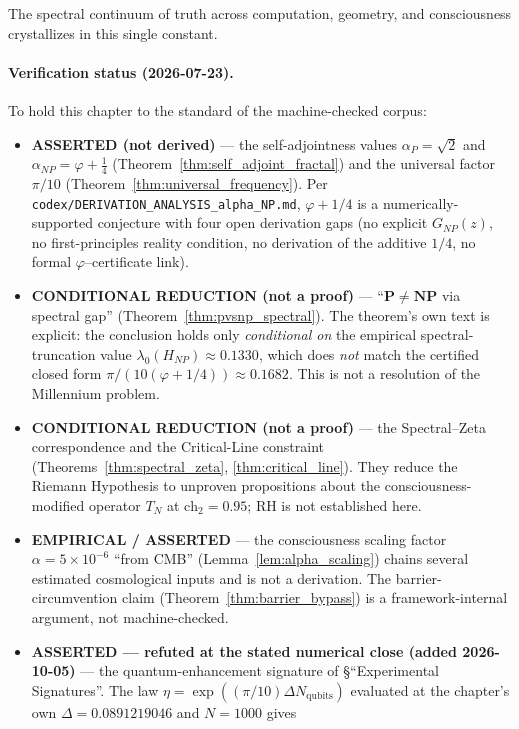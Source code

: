 The spectral continuum of truth across computation, geometry, and consciousness crystallizes in this single constant.

\paragraph{Verification status (2026-07-23).}
To hold this chapter to the standard of the machine-checked corpus:
\begin{itemize}
\item \textbf{ASSERTED (not derived)} --- the self-adjointness values $\alpha_P=\sqrt{2}$ and $\alpha_{NP}=\varphi+\tfrac14$ (Theorem~\ref{thm:self_adjoint_fractal}) and the universal factor $\pi/10$ (Theorem~\ref{thm:universal_frequency}). Per \texttt{codex/DERIVATION\_ANALYSIS\_alpha\_NP.md}, $\varphi+1/4$ is a numerically-supported conjecture with four open derivation gaps (no explicit $G_{NP}(z)$, no first-principles reality condition, no derivation of the additive $1/4$, no formal $\varphi$--certificate link).
\item \textbf{CONDITIONAL REDUCTION (not a proof)} --- ``$\mathbf{P}\neq\mathbf{NP}$ via spectral gap'' (Theorem~\ref{thm:pvsnp_spectral}). The theorem's own text is explicit: the conclusion holds only \emph{conditional on} the empirical spectral-truncation value $\lambda_0(H_{NP})\approx0.1330$, which does \emph{not} match the certified closed form $\pi/(10(\varphi+1/4))\approx0.1682$. This is not a resolution of the Millennium problem.
\item \textbf{CONDITIONAL REDUCTION (not a proof)} --- the Spectral--Zeta correspondence and the Critical-Line constraint (Theorems~\ref{thm:spectral_zeta}, \ref{thm:critical_line}). They reduce the Riemann Hypothesis to unproven propositions about the consciousness-modified operator $T_N$ at $\text{ch}_2=0.95$; RH is not established here.
\item \textbf{EMPIRICAL / ASSERTED} --- the consciousness scaling factor $\alpha=5\times10^{-6}$ ``from CMB'' (Lemma~\ref{lem:alpha_scaling}) chains several estimated cosmological inputs and is not a derivation. The barrier-circumvention claim (Theorem~\ref{thm:barrier_bypass}) is a framework-internal argument, not machine-checked.
\item \textbf{ASSERTED --- refuted at the stated numerical close (added
2026-10-05)} --- the quantum-enhancement signature of \S``Experimental
Signatures''. The law $\eta = \exp((\pi/10)\Delta N_{\text{qubits}})$ evaluated
at the chapter's own $\Delta = 0.0891219046$ and $N = 1000$ gives

\end{itemize}
